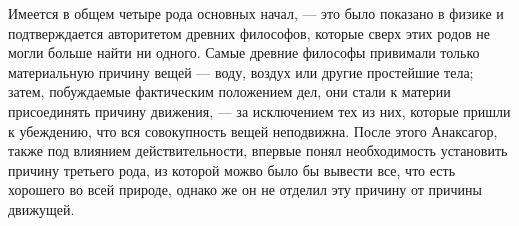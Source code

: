 \documentclass{article}
\begin{document}
Имеется в общем четыре рода основных начал, --- это было показано в физике и подтверждается авторитетом древних философов, которые сверх этих родов не могли больше найти ни одного. Самые древние философы привимали только материальную причину вещей --- воду, воздух или другие простейшие тела; затем, побуждаемые фактическим положением дел, они стали к материи присоединять причину движения, --- за исключением тех из них, которые пришли к убеждению, что вся совокупность вещей неподвижна. После этого Анаксагор, также под влиянием действительности, впервые понял необходимость установить причину третьего рода, из которой можво было бы вывести все, что есть хорошего во всей природе, однако же он не отделил эту причину от причины движущей.
\end{document}
